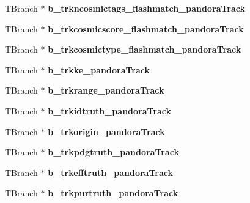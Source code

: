\begin{DoxyCompactItemize}
\item 
\hypertarget{classanatree_ab116c8b3fa8f5b41fef9521a63f1760d}{T\-Branch $\ast$ {\bfseries b\-\_\-trkncosmictags\-\_\-flashmatch\-\_\-pandora\-Track}}\label{classanatree_ab116c8b3fa8f5b41fef9521a63f1760d}

\item 
\hypertarget{classanatree_a3321e189e7b2ec484e2be9d93374eaf1}{T\-Branch $\ast$ {\bfseries b\-\_\-trkcosmicscore\-\_\-flashmatch\-\_\-pandora\-Track}}\label{classanatree_a3321e189e7b2ec484e2be9d93374eaf1}

\item 
\hypertarget{classanatree_acebcf60585925122544cbe6aa3383f17}{T\-Branch $\ast$ {\bfseries b\-\_\-trkcosmictype\-\_\-flashmatch\-\_\-pandora\-Track}}\label{classanatree_acebcf60585925122544cbe6aa3383f17}

\item 
\hypertarget{classanatree_ad366d472a32e99ee6d30cfeb3cbd86a1}{T\-Branch $\ast$ {\bfseries b\-\_\-trkke\-\_\-pandora\-Track}}\label{classanatree_ad366d472a32e99ee6d30cfeb3cbd86a1}

\item 
\hypertarget{classanatree_aa7d9036d8d92248e13100afced0b115b}{T\-Branch $\ast$ {\bfseries b\-\_\-trkrange\-\_\-pandora\-Track}}\label{classanatree_aa7d9036d8d92248e13100afced0b115b}

\item 
\hypertarget{classanatree_a2d6d7397cd6d0234946df824ea5ebfa0}{T\-Branch $\ast$ {\bfseries b\-\_\-trkidtruth\-\_\-pandora\-Track}}\label{classanatree_a2d6d7397cd6d0234946df824ea5ebfa0}

\item 
\hypertarget{classanatree_a1a5ee65d607fe38f9b2c219aad3fefb3}{T\-Branch $\ast$ {\bfseries b\-\_\-trkorigin\-\_\-pandora\-Track}}\label{classanatree_a1a5ee65d607fe38f9b2c219aad3fefb3}

\item 
\hypertarget{classanatree_a656e8c06ac7283b3eb376f152a04b281}{T\-Branch $\ast$ {\bfseries b\-\_\-trkpdgtruth\-\_\-pandora\-Track}}\label{classanatree_a656e8c06ac7283b3eb376f152a04b281}

\item 
\hypertarget{classanatree_a6546472f5d800c2482b89cb413cb9980}{T\-Branch $\ast$ {\bfseries b\-\_\-trkefftruth\-\_\-pandora\-Track}}\label{classanatree_a6546472f5d800c2482b89cb413cb9980}

\item 
\hypertarget{classanatree_af39e82004212f99644a3b15a4152e6a8}{T\-Branch $\ast$ {\bfseries b\-\_\-trkpurtruth\-\_\-pandora\-Track}}\label{classanatree_af39e82004212f99644a3b15a4152e6a8}


\end{DoxyCompactItemize}
